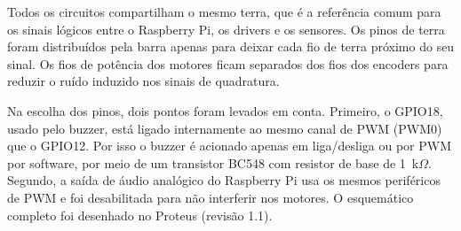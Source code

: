 
Todos os circuitos compartilham o mesmo terra, que é a referência comum
para os sinais lógicos entre o Raspberry Pi, os drivers e os sensores. Os
pinos de terra foram distribuídos pela barra apenas para deixar cada fio
de terra próximo do seu sinal. Os fios de potência dos motores ficam
separados dos fios dos encoders para reduzir o ruído induzido nos sinais
de quadratura.

Na escolha dos pinos, dois pontos foram levados em conta. Primeiro, o
GPIO18, usado pelo buzzer, está ligado internamente ao mesmo canal de PWM
(PWM0) que o GPIO12. Por isso o buzzer é acionado apenas em liga/desliga
ou por PWM por software, por meio de um transistor BC548 com resistor de
base de 1~k$\Omega$. Segundo, a saída de áudio analógico do Raspberry Pi
usa os mesmos periféricos de PWM e foi desabilitada para não interferir
nos motores. O esquemático completo foi desenhado no Proteus (revisão
1.1).
